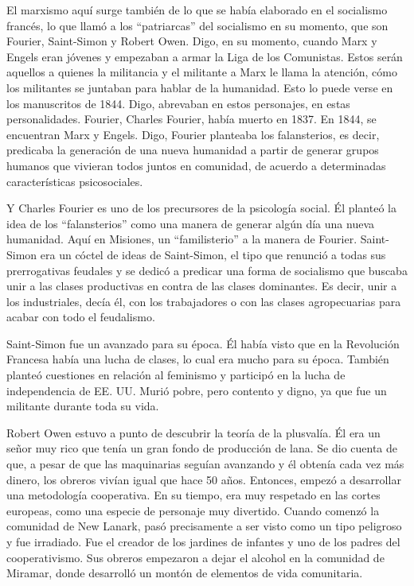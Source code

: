 \documentclass[
  jou,
  floatsintext,
  longtable,
  a4paper,
  nolmodern,
  notxfonts,
  notimes,
  colorlinks=true,linkcolor=blue,citecolor=blue,urlcolor=blue]{apa7}
\begin{document}
El marxismo aquí surge también de lo que se había elaborado en el
socialismo francés, lo que llamó a los ``patriarcas'' del socialismo en
su momento, que son Fourier, Saint-Simon y Robert Owen. Digo, en su
momento, cuando Marx y Engels eran jóvenes y empezaban a armar la Liga
de los Comunistas. Estos serán aquellos a quienes la militancia y el
militante a Marx le llama la atención, cómo los militantes se juntaban
para hablar de la humanidad. Esto lo puede verse en los manuscritos de
1844. Digo, abrevaban en estos personajes, en estas personalidades.
Fourier, Charles Fourier, había muerto en 1837. En 1844, se encuentran
Marx y Engels. Digo, Fourier planteaba los falansterios, es decir,
predicaba la generación de una nueva humanidad a partir de generar
grupos humanos que vivieran todos juntos en comunidad, de acuerdo a
determinadas características psicosociales.

Y Charles Fourier es uno de los precursores de la psicología social. Él
planteó la idea de los ``falansterios'' como una manera de generar algún
día una nueva humanidad. Aquí en Misiones, un ``familisterio'' a la
manera de Fourier. Saint-Simon era un cóctel de ideas de Saint-Simon, el
tipo que renunció a todas sus prerrogativas feudales y se dedicó a
predicar una forma de socialismo que buscaba unir a las clases
productivas en contra de las clases dominantes. Es decir, unir a los
industriales, decía él, con los trabajadores o con las clases
agropecuarias para acabar con todo el feudalismo.

Saint-Simon fue un avanzado para su época. Él había visto que en la
Revolución Francesa había una lucha de clases, lo cual era mucho para su
época. También planteó cuestiones en relación al feminismo y participó
en la lucha de independencia de EE. UU. Murió pobre, pero contento y
digno, ya que fue un militante durante toda su vida.

Robert Owen estuvo a punto de descubrir la teoría de la plusvalía. Él
era un señor muy rico que tenía un gran fondo de producción de lana. Se
dio cuenta de que, a pesar de que las maquinarias seguían avanzando y él
obtenía cada vez más dinero, los obreros vivían igual que hace 50 años.
Entonces, empezó a desarrollar una metodología cooperativa. En su
tiempo, era muy respetado en las cortes europeas, como una especie de
personaje muy divertido. Cuando comenzó la comunidad de New Lanark, pasó
precisamente a ser visto como un tipo peligroso y fue irradiado. Fue el
creador de los jardines de infantes y uno de los padres del
cooperativismo. Sus obreros empezaron a dejar el alcohol en la comunidad
de Miramar, donde desarrolló un montón de elementos de vida comunitaria.
\end{document}
